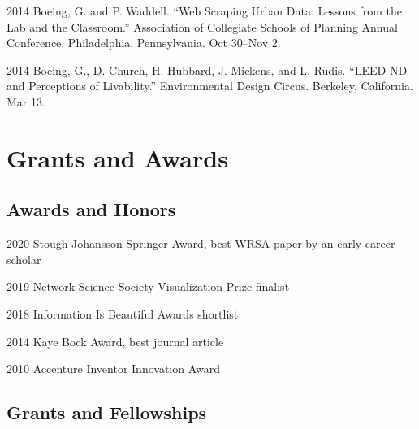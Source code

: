 \documentclass[12pt,letterpaper]{report}
\begin{document}
\begin{tablist}
        \item[2014] \tab Boeing, G. and P. Waddell. \enquote{Web Scraping Urban Data: Lessons from the Lab and the Classroom.} Association of Collegiate Schools of Planning Annual Conference. Philadelphia, Pennsylvania. Oct 30--Nov 2.

        \item[2014] \tab Boeing, G., D. Church, H. Hubbard, J. Mickens, and L. Rudis. \enquote{LEED-ND and Perceptions of Livability.} Environmental Design Circus. Berkeley, California. Mar 13.

    \end{tablist}



    \section*{Grants and Awards}

    \subsection*{Awards and Honors}

    \begin{tablist}

        \item[2020] \tab Stough-Johansson Springer Award, best WRSA paper by an early-career scholar

        \item[2019] \tab Network Science Society Visualization Prize finalist

        \item[2018] \tab Information Is Beautiful Awards shortlist

        \item[2014] \tab Kaye Bock Award, best journal article

        \item[2010] \tab Accenture Inventor Innovation Award

    \end{tablist}

    \subsection*{Grants and Fellowships}
\end{document}
